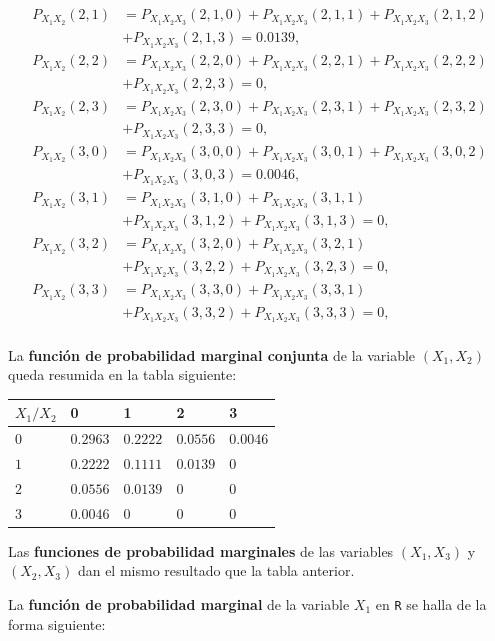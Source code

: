 \documentclass[]{book}
\begin{document}
\[\begin{array}{rl}
P_{X_1X_2}(2,1) & = P_{X_1X_2X_3}(2,1,0)+P_{X_1X_2X_3}(2,1,1)+P_{X_1X_2X_3}(2,1,2)\\
& +P_{X_1X_2X_3}(2,1,3)=0.0139, \\
P_{X_1X_2}(2,2) & = P_{X_1X_2X_3}(2,2,0)+P_{X_1X_2X_3}(2,2,1)+P_{X_1X_2X_3}(2,2,2)\\
& +P_{X_1X_2X_3}(2,2,3)=0, \\
P_{X_1X_2}(2,3) & = P_{X_1X_2X_3}(2,3,0)+P_{X_1X_2X_3}(2,3,1)+P_{X_1X_2X_3}(2,3,2)\\
& +P_{X_1X_2X_3}(2,3,3)=0, \\
P_{X_1X_2}(3,0) 
& = P_{X_1X_2X_3}(3,0,0)+P_{X_1X_2X_3}(3,0,1)+P_{X_1X_2X_3}(3,0,2)\\
& +P_{X_1X_2X_3}(3,0,3)=0.0046, \\
P_{X_1X_2}(3,1) & = P_{X_1X_2X_3}(3,1,0)+P_{X_1X_2X_3}(3,1,1)\\
& +P_{X_1X_2X_3}(3,1,2)+P_{X_1X_2X_3}(3,1,3)=0, \\
P_{X_1X_2}(3,2) & = P_{X_1X_2X_3}(3,2,0)+P_{X_1X_2X_3}(3,2,1)\\
& + P_{X_1X_2X_3}(3,2,2)+P_{X_1X_2X_3}(3,2,3)=0, \\
P_{X_1X_2}(3,3) & = P_{X_1X_2X_3}(3,3,0)+P_{X_1X_2X_3}(3,3,1)\\
& + P_{X_1X_2X_3}(3,3,2)+P_{X_1X_2X_3}(3,3,3)=0, \\
\end{array}
\]

La \textbf{función de probabilidad marginal conjunta} de la variable \((X_1,X_2)\) queda resumida en la tabla siguiente:

\begin{longtable}[]{@{}lllll@{}}
\toprule
\(X_1/X_2\) & 0 & 1 & 2 & 3\tabularnewline
\midrule
\endhead
\(0\) & \(0.2963\) & \(0.2222\) & \(0.0556\) & \(0.0046\)\tabularnewline
\(1\) & \(0.2222\) & \(0.1111\) & \(0.0139\) & \(0\)\tabularnewline
\(2\) & \(0.0556\) & \(0.0139\) & \(0\) & \(0\)\tabularnewline
\(3\) & \(0.0046\) & \(0\) & \(0\) & \(0\)\tabularnewline
\bottomrule
\end{longtable}

Las \textbf{funciones de probabilidad marginales} de las variables \((X_1,X_3)\) y \((X_2,X_3)\) dan el mismo resultado que la tabla anterior.

La \textbf{función de probabilidad marginal} de la variable \(X_1\) en \texttt{R} se halla de la forma siguiente:
\end{document}
